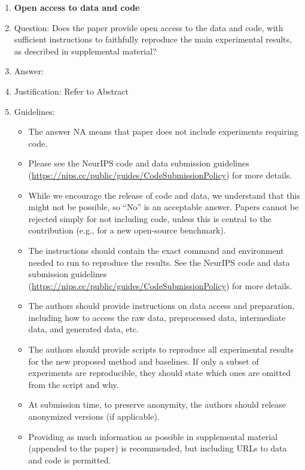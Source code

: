 \documentclass{article}
\begin{document}
\begin{enumerate}
\item {\bf Open access to data and code}
    \item[] Question: Does the paper provide open access to the data and code, with sufficient instructions to faithfully reproduce the main experimental results, as described in supplemental material?
    \item[] Answer: \answerYes{} %
    \item[] Justification: Refer to Abstract
    \item[] Guidelines:
    \begin{itemize}
        \item The answer NA means that paper does not include experiments requiring code.
        \item Please see the NeurIPS code and data submission guidelines (\url{https://nips.cc/public/guides/CodeSubmissionPolicy}) for more details.
        \item While we encourage the release of code and data, we understand that this might not be possible, so “No” is an acceptable answer. Papers cannot be rejected simply for not including code, unless this is central to the contribution (e.g., for a new open-source benchmark).
        \item The instructions should contain the exact command and environment needed to run to reproduce the results. See the NeurIPS code and data submission guidelines (\url{https://nips.cc/public/guides/CodeSubmissionPolicy}) for more details.
        \item The authors should provide instructions on data access and preparation, including how to access the raw data, preprocessed data, intermediate data, and generated data, etc.
        \item The authors should provide scripts to reproduce all experimental results for the new proposed method and baselines. If only a subset of experiments are reproducible, they should state which ones are omitted from the script and why.
        \item At submission time, to preserve anonymity, the authors should release anonymized versions (if applicable).
        \item Providing as much information as possible in supplemental material (appended to the paper) is recommended, but including URLs to data and code is permitted.
    \end{itemize}



\end{enumerate}
\end{document}
